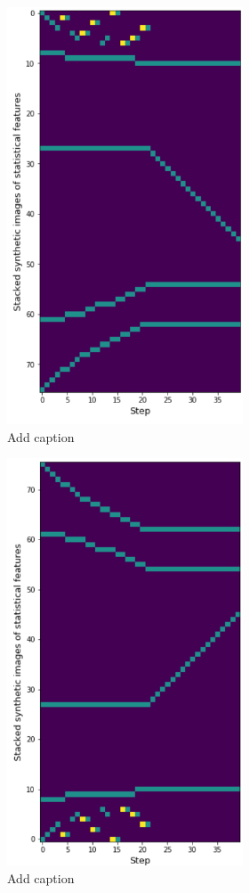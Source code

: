 \begin{minipage}{0.5\textwidth}
	\begin{figure}[H]
	\centering
	\includegraphics[width=7cm]{images/synImageOriginal.png}
	\caption[Bild kurz]{Add caption}
	\label{fig:synImOr}
\end{figure}
\end{minipage}
\begin{minipage}{0.5\textwidth}
	\begin{figure}[H]
		\centering
		\includegraphics[width=7cm]{images/synImage.png}
		\caption[Bild kurz]{Add caption}
		\label{fig:synIm}
	\end{figure}
\end{minipage}

